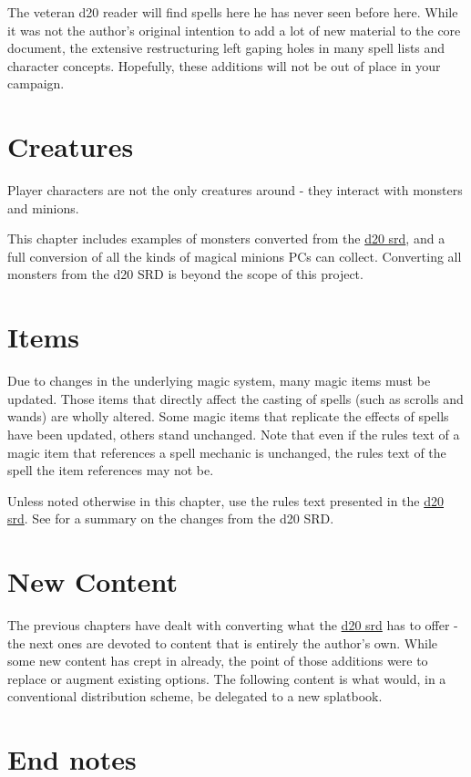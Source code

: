 \documentclass[a4paper,10pt]{article}
\begin{document}
\begin{multicols}{2}
The veteran d20 reader will find spells here he has never seen before here. While it was not the author's original intention to add a lot of new material to the core document, the extensive restructuring left gaping holes in many spell lists and character concepts. Hopefully, these additions will not be out of place in your campaign.

\newpage

\part{Creatures}
Player characters are not the only creatures around - they interact with monsters and minions.

This chapter includes examples of monsters converted from the \href{http://www.wizards.com/default.asp?x=d20/article/srd35}{d20 srd}, and a full conversion of all the kinds of magical minions PCs can collect. Converting all monsters from the d20 SRD is beyond the scope of this project.
\newpage
\newpage

\part{Items}
Due to changes in the underlying magic system, many magic items must be updated.
Those items that directly affect the casting of spells (such as scrolls and wands) are wholly altered.
Some magic items that replicate the effects of spells have been updated, others stand unchanged.
Note that even if the rules text of a magic item that references a spell mechanic is unchanged, the rules text of the spell the item references may not be.

Unless noted otherwise in this chapter, use the rules text presented in the \href{http://www.wizards.com/default.asp?x=d20/article/srd35}{d20 srd}. See  for a summary on the changes from the d20 SRD.
\newpage

\part{New Content}
The previous chapters have dealt with converting what the \href{http://www.wizards.com/default.asp?x=d20/article/srd35}{d20 srd} has to offer - the next ones are devoted to content that is entirely the author's own. While some new content has crept in already, the point of those additions were to replace or augment existing options. The following content is what would, in a conventional distribution scheme, be delegated to a new splatbook. 
\newpage
\part{End notes}

\end{multicols}
\end{document}

